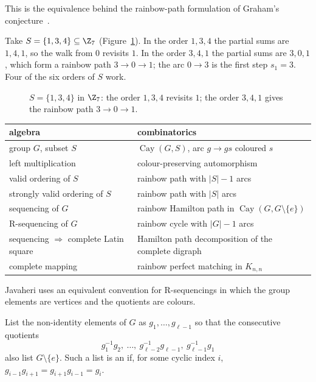 This is the equivalence behind the rainbow-path formulation of Graham's conjecture~\cite[\S1]{bfmpy25}.

\begin{example}\label{ex:z7}
Take $S=\{1,3,4\}\subseteq\Z_7$ (Figure~\ref{fig:z7-walks}). In the order $1,3,4$ the partial sums are $1,4,1$, so the walk from $0$ revisits $1$. In the order $3,4,1$ the partial sums are $3,0,1$, which form a rainbow path $3\to0\to1$; the arc $0\to3$ is the first step $s_1=3$. Four of the six orders of $S$ work.
\end{example}

\begin{figure}[ht]
\centering

\caption{$S=\{1,3,4\}$ in $\Z_7$: the order $1,3,4$ revisits $1$; the order $3,4,1$ gives the rainbow path $3\to0\to1$.}
\label{fig:z7-walks}
\end{figure}


\begin{center}
\renewcommand{\arraystretch}{1.25}
\small
\begin{tabular}{p{}p{}}
\textbf{algebra} & \textbf{combinatorics}\\\hline
group $G$, subset $S$ & $\operatorname{Cay}(G,S)$, arc $g\to gs$ coloured $s$\\
left multiplication & colour-preserving automorphism\\
valid ordering of $S$ & rainbow path with $|S|-1$ arcs\\
strongly valid ordering of $S$ & rainbow path with $|S|$ arcs\\
sequencing of $G$ & rainbow Hamilton path in $\operatorname{Cay}(G,G\setminus\{e\})$\\
R-sequencing of $G$ & rainbow cycle with $|G|-1$ arcs\\
sequencing $\Rightarrow$ complete Latin square & Hamilton path decomposition of the complete digraph\\
complete mapping & rainbow perfect matching in $K_{n,n}$
\end{tabular}
\end{center}


Javaheri uses an equivalent convention for R-sequencings in which the group elements are vertices and the quotients are colours.

\begin{definition}\label{def:r-star}
List the non-identity elements of $G$ as $g_1,\dots,g_{\ell-1}$ so that the consecutive quotients
\[
g_1^{-1}g_2,\ \dots,\ g_{\ell-2}^{-1}g_{\ell-1},\ g_{\ell-1}^{-1}g_1
\]
also list $G\setminus\{e\}$. Such a list is an  if, for some cyclic index $i$, $g_{i-1}g_{i+1}=g_{i+1}g_{i-1}=g_i$.
\end{definition}

